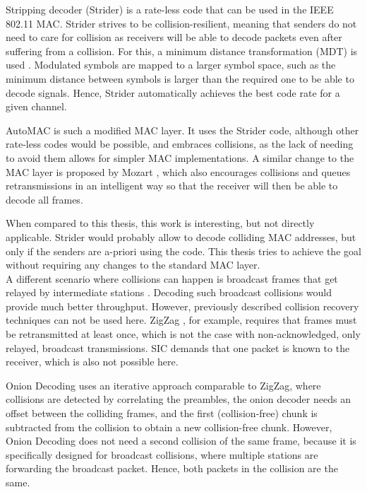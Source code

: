 Stripping decoder (Strider) \cite{gudipati2011} is a rate-less code that can be used in the IEEE 802.11 \gls{MAC}. Strider strives to be collision-resilient, meaning that senders do not need to care for collision as receivers will be able to decode packets even after suffering from a collision. For this, a minimum distance transformation (MDT) is used \cite{gudipati2011}. Modulated symbols are mapped to a larger symbol space, such as the minimum distance between symbols is larger than the required one to be able to decode signals. Hence, Strider automatically achieves the best code rate for a given channel.

AutoMAC \cite{gudipati2012} is such a modified \gls{MAC} layer. It uses the Strider code, although other rate-less codes would be possible, and embraces collisions, as the lack of needing to avoid them allows for simpler \gls{MAC} implementations. A similar change to the \gls{MAC} layer is proposed by Mozart \cite{bansal2013}, which also encourages collisions and queues retransmissions in an intelligent way so that the receiver will then be able to decode all frames.

When compared to this thesis, this work is interesting, but not directly applicable. Strider would probably allow to decode colliding \gls{MAC} addresses, but only if the senders are a-priori using the code. This thesis tries to achieve the goal without requiring any changes to the standard \gls{MAC} layer.\\

A different scenario where collisions can happen is broadcast frames that get relayed by intermediate stations \cite{hejazi2010}. Decoding  such broadcast collisions would provide much better throughput. However, previously described collision recovery techniques can not be used here. ZigZag \cite{gollakota2008}, for example, requires that frames must be retransmitted at least once, which is not the case with non-acknowledged, only relayed, broadcast transmissions. \gls{SIC} \cite{patel1994} demands that one packet is known to the receiver, which is also not possible here.

Onion Decoding \cite{wang2010} uses an iterative approach  comparable to ZigZag, where collisions are detected by correlating the preambles, the onion decoder needs an offset between the colliding frames, and the first (collision-free) chunk is subtracted from the collision to obtain a new collision-free chunk. However, Onion Decoding does not need a second collision of the same frame, because it is specifically designed for broadcast collisions, where multiple stations are forwarding the broadcast packet. Hence, both packets in the collision are the same.


